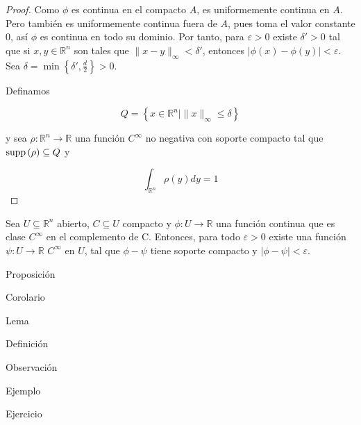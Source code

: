 \documentclass[12pt]{report}
\theoremstyle{largebreak}
\newcommand\abs[1]{\ensuremath{\lvert#1\rvert}}
\newcommand\cf[3]{\ensuremath{#1:#2\rightarrow#3}}
\newcommand\supp[1]{\ensuremath{\textup{supp}\left(#1\right)}}
\begin{document}
\begin{proof}
    Como $\phi$ es continua en el compacto $A$, es uniformemente continua en $A$. Pero también es uniformemente continua fuera de $A$, pues toma el valor constante $0$, así $\phi$ es continua en todo su dominio.
    Por tanto, para $\varepsilon>0$ existe $\delta'>0$ tal que si $x,y\in\mathbb{R}^n$ son tales que $\|x-y\|_{\infty}<\delta'$, entonces $\abs{\phi(x)-\phi(y)}<\varepsilon$. Sea $\delta =\min\left\{\delta',\frac{d}{2}\right\}>0$.

    Definamos
    
    \begin{equation*}
        Q=\left\{x\in\mathbb{R}^n|\|x\|_{\infty}\leq\delta\right\}
    \end{equation*}
    
    y sea $\cf{\rho}{\mathbb{R}^n}{\mathbb{R}}$ una función $C^{\infty}$ no negativa con soporte compacto tal que $\supp{\rho}\subseteq Q$ y
    
    \begin{equation*}
        \int_{\mathbb{R}^n}\rho(y)dy=1
    \end{equation*}

    \end{proof}

\begin{lema}
    Sea $U\subseteq\mathbb{R}^n$ abierto, $C\subseteq U$ compacto y $\cf{\phi}{U}{\mathbb{R}}$ una función continua que es clase $C^{\infty}$ en el complemento de C. Entonces, para todo $\varepsilon > 0$ existe una función $\cf{\psi}{U}{\mathbb{R}}$ $C^{\infty}$ en $U$, tal que $\phi - \psi$ tiene soporte compacto y $\abs{\phi - \psi}<\varepsilon$.
\end{lema}

\begin{theor}
    
\end{theor}

    \begin{propo}[Nombre]
        Proposición
    \end{propo}

    \begin{cor}[Nombre]
        Corolario
    \end{cor}

    \begin{lema}[Nombre]
        Lema
    \end{lema}

    \begin{mydef}[Nombre]
        Definición
    \end{mydef}

    \begin{obs}[Nombre]
        Observación
    \end{obs}

    \begin{exa}[Nombre]
        Ejemplo
    \end{exa}

    \begin{excer}[Nombre]
        Ejercicio
    \end{excer}
\end{document}
